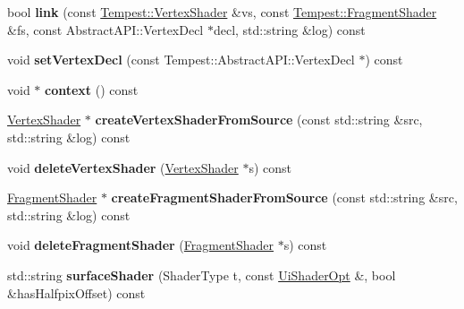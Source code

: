 \begin{DoxyCompactItemize}
\item 
\hypertarget{class_tempest_1_1_g_l_s_l_aa178c5fa5a4db9bd07bc4dcf19f08807}{bool {\bfseries link} (const \hyperlink{class_tempest_1_1_vertex_shader}{Tempest\+::\+Vertex\+Shader} \&vs, const \hyperlink{class_tempest_1_1_fragment_shader}{Tempest\+::\+Fragment\+Shader} \&fs, const Abstract\+A\+P\+I\+::\+Vertex\+Decl $\ast$decl, std\+::string \&log) const }\label{class_tempest_1_1_g_l_s_l_aa178c5fa5a4db9bd07bc4dcf19f08807}

\item 
\hypertarget{class_tempest_1_1_g_l_s_l_a79f93d775f1aead43ac56057b33d2bea}{void {\bfseries set\+Vertex\+Decl} (const Tempest\+::\+Abstract\+A\+P\+I\+::\+Vertex\+Decl $\ast$) const }\label{class_tempest_1_1_g_l_s_l_a79f93d775f1aead43ac56057b33d2bea}

\item 
\hypertarget{class_tempest_1_1_g_l_s_l_afcca5f3279d4f40fc64c1e437a152b5a}{void $\ast$ {\bfseries context} () const }\label{class_tempest_1_1_g_l_s_l_afcca5f3279d4f40fc64c1e437a152b5a}

\item 
\hypertarget{class_tempest_1_1_g_l_s_l_a504b7bb701a4dd27790f9b4310682a0c}{\hyperlink{class_tempest_1_1_vertex_shader}{Vertex\+Shader} $\ast$ {\bfseries create\+Vertex\+Shader\+From\+Source} (const std\+::string \&src, std\+::string \&log) const }\label{class_tempest_1_1_g_l_s_l_a504b7bb701a4dd27790f9b4310682a0c}

\item 
\hypertarget{class_tempest_1_1_g_l_s_l_a6711cb752d0cb897f8ccac0fa3efb4c9}{void {\bfseries delete\+Vertex\+Shader} (\hyperlink{class_tempest_1_1_vertex_shader}{Vertex\+Shader} $\ast$s) const }\label{class_tempest_1_1_g_l_s_l_a6711cb752d0cb897f8ccac0fa3efb4c9}

\item 
\hypertarget{class_tempest_1_1_g_l_s_l_afb8672792ad724e6b76ebef1feae14a8}{\hyperlink{class_tempest_1_1_fragment_shader}{Fragment\+Shader} $\ast$ {\bfseries create\+Fragment\+Shader\+From\+Source} (const std\+::string \&src, std\+::string \&log) const }\label{class_tempest_1_1_g_l_s_l_afb8672792ad724e6b76ebef1feae14a8}

\item 
\hypertarget{class_tempest_1_1_g_l_s_l_af40b92f09afee1937c0c6651137b4a01}{void {\bfseries delete\+Fragment\+Shader} (\hyperlink{class_tempest_1_1_fragment_shader}{Fragment\+Shader} $\ast$s) const }\label{class_tempest_1_1_g_l_s_l_af40b92f09afee1937c0c6651137b4a01}

\item 
\hypertarget{class_tempest_1_1_g_l_s_l_ae564a02582020c313d119050fbf5ed89}{std\+::string {\bfseries surface\+Shader} (Shader\+Type t, const \hyperlink{struct_tempest_1_1_abstract_shading_lang_1_1_ui_shader_opt}{Ui\+Shader\+Opt} \&, bool \&has\+Halfpix\+Offset) const }\label{class_tempest_1_1_g_l_s_l_ae564a02582020c313d119050fbf5ed89}

\end{DoxyCompactItemize}
